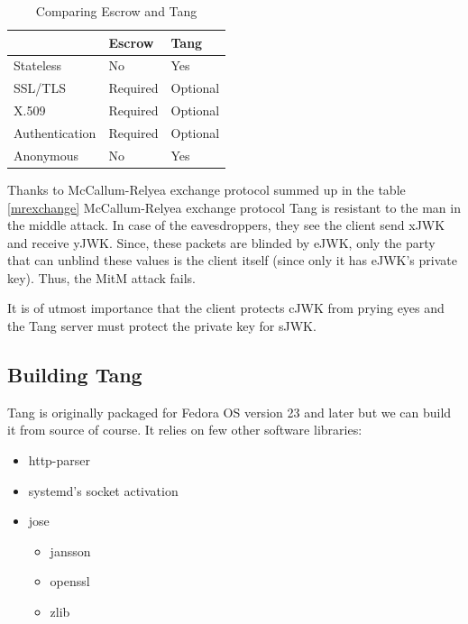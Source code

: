 \begin{table}[h]
\centering
\label{compare}
\begin{tabular}{@{}lll@{}}
\toprule
               & Escrow   & Tang                         \\ \midrule
Stateless      & No       & Yes                          \\
SSL/TLS        & Required & Optional                     \\
X.509          & Required & Optional                     \\
Authentication & Required & Optional                     \\
Anonymous      & No       & Yes                          \\ \bottomrule
\end{tabular}
\caption{Comparing Escrow and Tang}
\end{table}

Thanks to McCallum-Relyea exchange protocol summed up in the table \ref{mrexchange} McCallum-Relyea exchange protocol Tang is resistant to the man in the middle attack.
In case of the eavesdroppers, they see the client send xJWK and receive yJWK.
Since, these packets are blinded by eJWK, only the party that can unblind these values is the client itself (since only it has eJWK's private key). %
Thus, the MitM attack fails.

It is of utmost importance that the client protects cJWK from prying eyes and the Tang server must protect the private key for sJWK.



\subsection{Building Tang}

Tang is originally packaged for Fedora OS version 23 and later but we can build it from source of course.
It relies on few other software libraries:
\label{dependencies}
\begin{itemize}
\item http-parser
\item systemd's socket activation
\item jose
    \begin{itemize}
    \item jansson
    \item openssl
    \item zlib
    \end{itemize}
\end{itemize}

